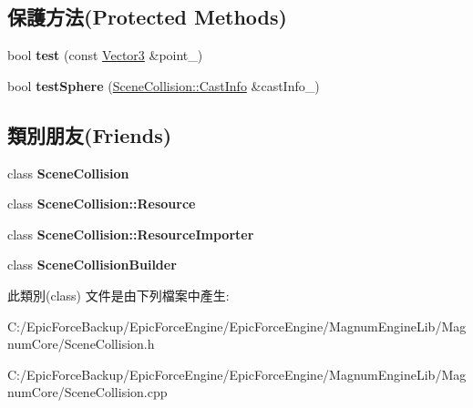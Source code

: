 \subsection*{保護方法(Protected Methods)}
\begin{DoxyCompactItemize}
\item 
bool {\bfseries test} (const \hyperlink{class_magnum_1_1_vector3}{Vector3} \&point\+\_\+)\hypertarget{class_magnum_1_1_scene_collision_1_1_height_field_a5cd4318b7ad9284bcb994cd1659f2814}{}\label{class_magnum_1_1_scene_collision_1_1_height_field_a5cd4318b7ad9284bcb994cd1659f2814}

\item 
bool {\bfseries test\+Sphere} (\hyperlink{class_magnum_1_1_scene_collision_1_1_cast_info}{Scene\+Collision\+::\+Cast\+Info} \&cast\+Info\+\_\+)\hypertarget{class_magnum_1_1_scene_collision_1_1_height_field_a3ae2a2040b7ffac05f81f937db37d4b8}{}\label{class_magnum_1_1_scene_collision_1_1_height_field_a3ae2a2040b7ffac05f81f937db37d4b8}

\end{DoxyCompactItemize}
\subsection*{類別朋友(Friends)}
\begin{DoxyCompactItemize}
\item 
class {\bfseries Scene\+Collision}\hypertarget{class_magnum_1_1_scene_collision_1_1_height_field_a7f7f4483f99e66d8de91c12344383316}{}\label{class_magnum_1_1_scene_collision_1_1_height_field_a7f7f4483f99e66d8de91c12344383316}

\item 
class {\bfseries Scene\+Collision\+::\+Resource}\hypertarget{class_magnum_1_1_scene_collision_1_1_height_field_a71b236c1c24fec68b8fc80e32c6a1df9}{}\label{class_magnum_1_1_scene_collision_1_1_height_field_a71b236c1c24fec68b8fc80e32c6a1df9}

\item 
class {\bfseries Scene\+Collision\+::\+Resource\+Importer}\hypertarget{class_magnum_1_1_scene_collision_1_1_height_field_a7892633f22a5e0a8a9dcf89bb56cdff8}{}\label{class_magnum_1_1_scene_collision_1_1_height_field_a7892633f22a5e0a8a9dcf89bb56cdff8}

\item 
class {\bfseries Scene\+Collision\+Builder}\hypertarget{class_magnum_1_1_scene_collision_1_1_height_field_a2d946a399a3297cd5ab77a3604b6211e}{}\label{class_magnum_1_1_scene_collision_1_1_height_field_a2d946a399a3297cd5ab77a3604b6211e}

\end{DoxyCompactItemize}


此類別(class) 文件是由下列檔案中產生\+:\begin{DoxyCompactItemize}
\item 
C\+:/\+Epic\+Force\+Backup/\+Epic\+Force\+Engine/\+Epic\+Force\+Engine/\+Magnum\+Engine\+Lib/\+Magnum\+Core/Scene\+Collision.\+h\item 
C\+:/\+Epic\+Force\+Backup/\+Epic\+Force\+Engine/\+Epic\+Force\+Engine/\+Magnum\+Engine\+Lib/\+Magnum\+Core/Scene\+Collision.\+cpp\end{DoxyCompactItemize}
